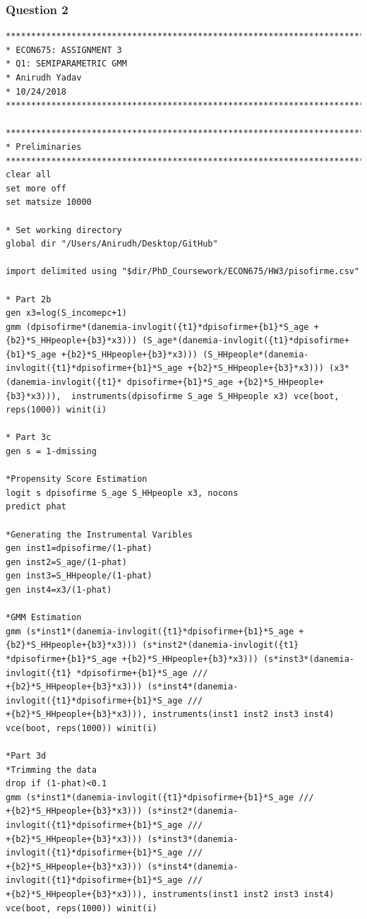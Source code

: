 \documentclass[12pt]{article}
\begin{document}
\subsubsection{Question 2}
\begin{verbatim}
********************************************************************************
* ECON675: ASSIGNMENT 3
* Q1: SEMIPARAMETRIC GMM
* Anirudh Yadav
* 10/24/2018
********************************************************************************

********************************************************************************
* Preliminaries
********************************************************************************
clear all
set more off
set matsize 10000

* Set working directory 
global dir "/Users/Anirudh/Desktop/GitHub"

import delimited using "$dir/PhD_Coursework/ECON675/HW3/pisofirme.csv"

* Part 2b
gen x3=log(S_incomepc+1)
gmm (dpisofirme*(danemia-invlogit({t1}*dpisofirme+{b1}*S_age +{b2}*S_HHpeople+{b3}*x3))) (S_age*(danemia-invlogit({t1}*dpisofirme+{b1}*S_age +{b2}*S_HHpeople+{b3}*x3))) (S_HHpeople*(danemia-invlogit({t1}*dpisofirme+{b1}*S_age +{b2}*S_HHpeople+{b3}*x3))) (x3*(danemia-invlogit({t1}* dpisofirme+{b1}*S_age +{b2}*S_HHpeople+{b3}*x3))),  instruments(dpisofirme S_age S_HHpeople x3) vce(boot, reps(1000)) winit(i)

* Part 3c
gen s = 1-dmissing

*Propensity Score Estimation
logit s dpisofirme S_age S_HHpeople x3, nocons
predict phat

*Generating the Instrumental Varibles
gen inst1=dpisofirme/(1-phat)
gen inst2=S_age/(1-phat)
gen inst3=S_HHpeople/(1-phat)
gen inst4=x3/(1-phat)

*GMM Estimation
gmm (s*inst1*(danemia-invlogit({t1}*dpisofirme+{b1}*S_age +{b2}*S_HHpeople+{b3}*x3))) (s*inst2*(danemia-invlogit({t1} *dpisofirme+{b1}*S_age +{b2}*S_HHpeople+{b3}*x3))) (s*inst3*(danemia-invlogit({t1} *dpisofirme+{b1}*S_age ///
+{b2}*S_HHpeople+{b3}*x3))) (s*inst4*(danemia-invlogit({t1}*dpisofirme+{b1}*S_age ///
+{b2}*S_HHpeople+{b3}*x3))), instruments(inst1 inst2 inst3 inst4) 
vce(boot, reps(1000)) winit(i) 

*Part 3d
*Trimming the data
drop if (1-phat)<0.1
gmm (s*inst1*(danemia-invlogit({t1}*dpisofirme+{b1}*S_age ///
+{b2}*S_HHpeople+{b3}*x3))) (s*inst2*(danemia-invlogit({t1}*dpisofirme+{b1}*S_age ///
+{b2}*S_HHpeople+{b3}*x3))) (s*inst3*(danemia-invlogit({t1}*dpisofirme+{b1}*S_age ///
+{b2}*S_HHpeople+{b3}*x3))) (s*inst4*(danemia-invlogit({t1}*dpisofirme+{b1}*S_age ///
+{b2}*S_HHpeople+{b3}*x3))), instruments(inst1 inst2 inst3 inst4) vce(boot, reps(1000)) winit(i)



\end{verbatim}
\end{document}
